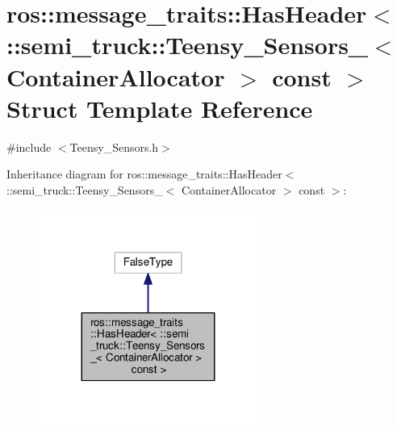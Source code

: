 \hypertarget{structros_1_1message__traits_1_1_has_header_3_01_1_1semi__truck_1_1_teensy___sensors___3_01_cont27420888fce5a6e96344b08bcfbbf57b}{}\section{ros\+:\+:message\+\_\+traits\+:\+:Has\+Header$<$ \+:\+:semi\+\_\+truck\+:\+:Teensy\+\_\+\+Sensors\+\_\+$<$ Container\+Allocator $>$ const $>$ Struct Template Reference}
\label{structros_1_1message__traits_1_1_has_header_3_01_1_1semi__truck_1_1_teensy___sensors___3_01_cont27420888fce5a6e96344b08bcfbbf57b}


{\ttfamily \#include $<$Teensy\+\_\+\+Sensors.\+h$>$}



Inheritance diagram for ros\+:\+:message\+\_\+traits\+:\+:Has\+Header$<$ \+:\+:semi\+\_\+truck\+:\+:Teensy\+\_\+\+Sensors\+\_\+$<$ Container\+Allocator $>$ const $>$\+:\nopagebreak
\begin{figure}[H]
\begin{center}
\leavevmode
\includegraphics[width=203pt]{structros_1_1message__traits_1_1_has_header_3_01_1_1semi__truck_1_1_teensy___sensors___3_01_contf7f62526d34fd86c71475ca367bd221d}
\end{center}
\end{figure}


